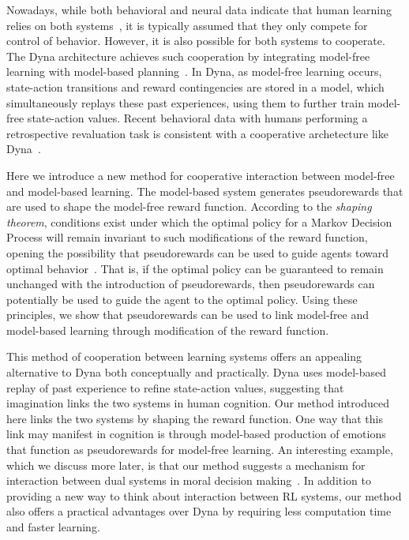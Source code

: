 \documentclass[letterpaper]{article}
\begin{document}
Nowadays, while both behavioral and neural data indicate that human learning relies on both systems~\cite{daw2005uncertainty, glascher2010states, dayan2014model}, it is typically assumed that they only compete for control of behavior. However, it is also possible for both systems to cooperate. The Dyna architecture achieves such cooperation by integrating model-free learning with model-based planning~\cite{sutton1991dyna}. In Dyna, as model-free learning occurs, state-action transitions and reward contingencies are stored in a model, which simultaneously replays these past experiences, using them to further train model-free state-action values. Recent behavioral data with humans performing a retrospective revaluation task is consistent with a cooperative archetecture like Dyna~\cite{gershman2014retrospective}.

Here we introduce a new method for cooperative interaction between model-free and model-based learning. The model-based system generates pseudorewards that are used to shape the model-free reward function. According to the \textit{shaping theorem}, conditions exist under which the optimal policy for a Markov Decision Process will remain invariant to such modifications of the reward function, opening the possibility that pseudorewards can be used to guide agents toward optimal behavior~\cite{ng1999policy}. That is, if the optimal policy can be guaranteed to remain unchanged with the introduction of pseudorewards, then pseudorewards can potentially be used to guide the agent to the optimal policy. Using these principles, we show that pseudorewards can be used to link model-free and model-based learning through modification of the reward function.

This method of cooperation between learning systems offers an appealing alternative to Dyna both conceptually and practically. Dyna uses model-based replay of past experience to refine state-action values, suggesting that imagination links the two systems in human cognition. Our method introduced here links the two systems by shaping the reward function. One way that this link may manifest in cognition is through model-based production of emotions that function as pseudorewards for model-free learning. An interesting example, which we discuss more later, is that our method suggests a mechanism for interaction between dual systems in moral decision making~\cite{cushman2013action, crockett2013models}. In addition to providing a new way to think about interaction between RL systems, our method also offers a practical advantages over Dyna by requiring less computation time and faster learning.
\end{document}
